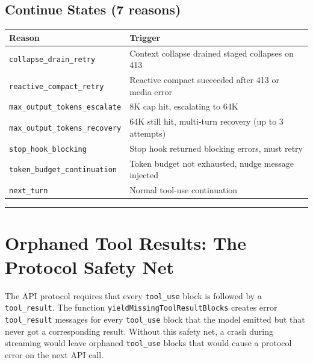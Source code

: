 \documentclass[
  english,
  11pt,
  letterpaper,
]{book}
\begin{document}
\subsection{Continue States (7
reasons)}\label{continue-states-7-reasons}

\begin{longtable}[]{@{}
  >{\raggedright\arraybackslash}p{}
  >{\raggedright\arraybackslash}p{}@{}}
\toprule\noalign{}
\begin{minipage}[b]{\linewidth}\raggedright
Reason
\end{minipage} & \begin{minipage}[b]{\linewidth}\raggedright
Trigger
\end{minipage} \\
\midrule\noalign{}
\endhead
\bottomrule\noalign{}
\endlastfoot
\texttt{collapse\_drain\_retry} & Context collapse drained staged
collapses on 413 \\
\texttt{reactive\_compact\_retry} & Reactive compact succeeded after 413
or media error \\
\texttt{max\_output\_tokens\_escalate} & 8K cap hit, escalating to
64K \\
\texttt{max\_output\_tokens\_recovery} & 64K still hit, multi-turn
recovery (up to 3 attempts) \\
\texttt{stop\_hook\_blocking} & Stop hook returned blocking errors, must
retry \\
\texttt{token\_budget\_continuation} & Token budget not exhausted, nudge
message injected \\
\texttt{next\_turn} & Normal tool-use continuation \\
\end{longtable}

\begin{center}\rule{0.5\linewidth}{0.5pt}\end{center}

\section{Orphaned Tool Results: The Protocol Safety
Net}\label{orphaned-tool-results-the-protocol-safety-net}

The API protocol requires that every \texttt{tool\_use} block is
followed by a \texttt{tool\_result}. The function
\texttt{yieldMissingToolResultBlocks} creates error
\texttt{tool\_result} messages for every \texttt{tool\_use} block that
the model emitted but that never got a corresponding result. Without
this safety net, a crash during streaming would leave orphaned
\texttt{tool\_use} blocks that would cause a protocol error on the next
API call.
\end{document}
